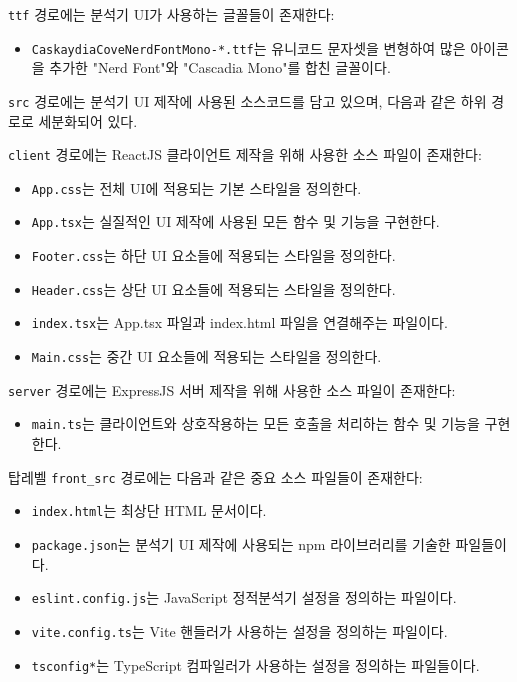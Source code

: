 \documentclass[a4paper,12pt]{article}
\begin{document}
\verb|ttf| 경로에는 분석기 UI가 사용하는 글꼴들이 존재한다:
\begin{itemize}
    \item \verb|CaskaydiaCoveNerdFontMono-*.ttf|는 유니코드 문자셋을 변형하여 많은 아이콘을 추가한 "Nerd Font"와 "Cascadia Mono"를 합친 글꼴이다.
\end{itemize}

\verb|src| 경로에는 분석기 UI 제작에 사용된 소스코드를 담고 있으며, 다음과 같은 하위 경로로 세분화되어 있다.

\verb|client| 경로에는 ReactJS 클라이언트 제작을 위해 사용한 소스 파일이 존재한다:
\begin{itemize}
    \item \verb|App.css|는 전체 UI에 적용되는 기본 스타일을 정의한다.
    \item \verb|App.tsx|는 실질적인 UI 제작에 사용된 모든 함수 및 기능을 구현한다.
    \item \verb|Footer.css|는 하단 UI 요소들에 적용되는 스타일을 정의한다.
    \item \verb|Header.css|는 상단 UI 요소들에 적용되는 스타일을 정의한다.
    \item \verb|index.tsx|는 App.tsx 파일과 index.html 파일을 연결해주는 파일이다.
    \item \verb|Main.css|는 중간 UI 요소들에 적용되는 스타일을 정의한다.
\end{itemize}

\verb|server| 경로에는 ExpressJS 서버 제작을 위해 사용한 소스 파일이 존재한다:
\begin{itemize}
    \item \verb|main.ts|는 클라이언트와 상호작용하는 모든 호출을 처리하는 함수 및 기능을 구현한다.
\end{itemize}

탑레벨 \verb|front_src| 경로에는 다음과 같은 중요 소스 파일들이 존재한다:
\begin{itemize}
    \item \verb|index.html|는 최상단 HTML 문서이다.
    \item \verb|package.json|는 분석기 UI 제작에 사용되는 npm 라이브러리를 기술한 파일들이다.
    \item \verb|eslint.config.js|는 JavaScript 정적분석기 설정을 정의하는 파일이다.
    \item \verb|vite.config.ts|는 Vite 핸들러가 사용하는 설정을 정의하는 파일이다.
    \item \verb|tsconfig*|는 TypeScript 컴파일러가 사용하는 설정을 정의하는 파일들이다.
\end{itemize}
\end{document}
